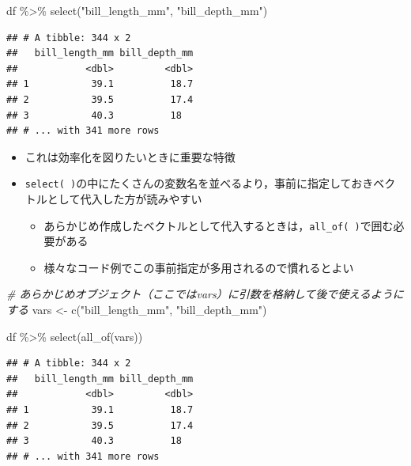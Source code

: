 \documentclass[
  xelatex,ja=standard, b5paper]{bxjsbook}
\newenvironment{Shaded}{\begin{snugshade}}{\end{snugshade}}
\newcommand{\CommentTok}[1]{\textcolor[rgb]{0.56,0.35,0.01}{\textit{#1}}}
\newcommand{\FunctionTok}[1]{\textcolor[rgb]{0.00,0.00,0.00}{#1}}
\newcommand{\NormalTok}[1]{#1}
\newcommand{\OtherTok}[1]{\textcolor[rgb]{0.56,0.35,0.01}{#1}}
\newcommand{\SpecialCharTok}[1]{\textcolor[rgb]{0.00,0.00,0.00}{#1}}
\newcommand{\StringTok}[1]{\textcolor[rgb]{0.31,0.60,0.02}{#1}}
\providecommand{\tightlist}{%
  \setlength{\itemsep}{0pt}\setlength{\parskip}{0pt}}
\begin{document}
\begin{Shaded}
\begin{Highlighting}[]
\NormalTok{df }\SpecialCharTok{\%\textgreater{}\%} 
  \FunctionTok{select}\NormalTok{(}\StringTok{"bill\_length\_mm"}\NormalTok{, }\StringTok{"bill\_depth\_mm"}\NormalTok{)}
\end{Highlighting}
\end{Shaded}

\begin{verbatim}
## # A tibble: 344 x 2
##   bill_length_mm bill_depth_mm
##            <dbl>         <dbl>
## 1           39.1          18.7
## 2           39.5          17.4
## 3           40.3          18  
## # ... with 341 more rows
\end{verbatim}

\begin{itemize}
\tightlist
\item
  これは効率化を図りたいときに重要な特徴
\item
  \texttt{select(\ )}の中にたくさんの変数名を並べるより，事前に指定しておきベクトルとして代入した方が読みやすい

  \begin{itemize}
  \tightlist
  \item
    あらかじめ作成したベクトルとして代入するときは，\texttt{all\_of(\ )}で囲む必要がある
  \item
    様々なコード例でこの事前指定が多用されるので慣れるとよい
  \end{itemize}
\end{itemize}

\begin{Shaded}
\begin{Highlighting}[]
\CommentTok{\# あらかじめオブジェクト（ここではvars）に引数を格納して後で使えるようにする}
\NormalTok{vars }\OtherTok{\textless{}{-}} \FunctionTok{c}\NormalTok{(}\StringTok{"bill\_length\_mm"}\NormalTok{, }\StringTok{"bill\_depth\_mm"}\NormalTok{)}

\NormalTok{df }\SpecialCharTok{\%\textgreater{}\%} 
  \FunctionTok{select}\NormalTok{(}\FunctionTok{all\_of}\NormalTok{(vars))}
\end{Highlighting}
\end{Shaded}

\begin{verbatim}
## # A tibble: 344 x 2
##   bill_length_mm bill_depth_mm
##            <dbl>         <dbl>
## 1           39.1          18.7
## 2           39.5          17.4
## 3           40.3          18  
## # ... with 341 more rows
\end{verbatim}
\end{document}
